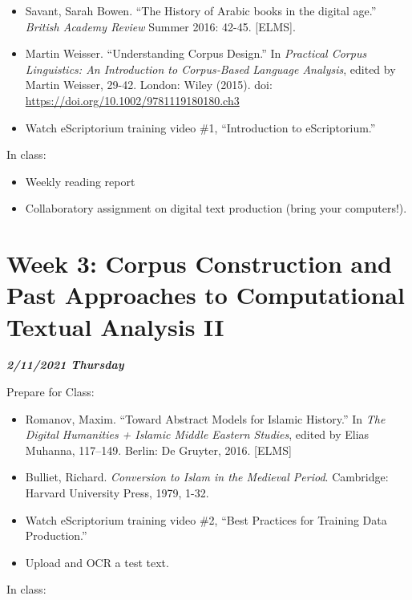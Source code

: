 \documentclass[
]{book}
\providecommand{\tightlist}{%
  \setlength{\itemsep}{0pt}\setlength{\parskip}{0pt}}
\begin{document}
\begin{itemize}
\tightlist
\item
  Savant, Sarah Bowen. ``The History of Arabic books in the digital age.'' \emph{British Academy Review} Summer 2016: 42-45. {[}ELMS{]}.
\item
  Martin Weisser. ``Understanding Corpus Design.'' In \emph{Practical Corpus Linguistics: An Introduction to Corpus‐Based Language Analysis}, edited by Martin Weisser, 29-42. London: Wiley (2015). doi: \url{https://doi.org/10.1002/9781119180180.ch3}
\item
  Watch eScriptorium training video \#1, ``Introduction to eScriptorium.''
\end{itemize}

In class:

\begin{itemize}
\tightlist
\item
  Weekly reading report
\item
  Collaboratory assignment on digital text production (bring your computers!).
\end{itemize}

\hypertarget{week-3-corpus-construction-and-past-approaches-to-computational-textual-analysis-ii-1}{%
\chapter{Week 3: Corpus Construction and Past Approaches to Computational Textual Analysis II}\label{week-3-corpus-construction-and-past-approaches-to-computational-textual-analysis-ii-1}}

\textbf{\emph{2/11/2021 Thursday}}

Prepare for Class:

\begin{itemize}
\tightlist
\item
  Romanov, Maxim. ``Toward Abstract Models for Islamic History.'' In \emph{The Digital Humanities + Islamic Middle Eastern Studies}, edited by Elias Muhanna, 117--149. Berlin: De Gruyter, 2016. {[}ELMS{]}
\item
  Bulliet, Richard. \emph{Conversion to Islam in the Medieval Period}. Cambridge: Harvard University Press, 1979, 1-32.
\item
  Watch eScriptorium training video \#2, ``Best Practices for Training Data Production.''
\item
  Upload and OCR a test text.
\end{itemize}

In class:
\end{document}
